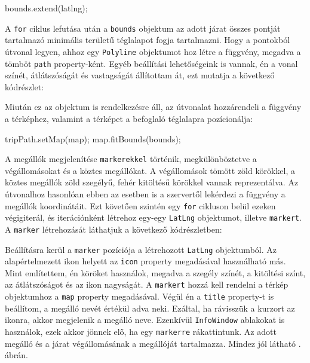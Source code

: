 \begin{cpp}
bounds.extend(latlng);
\end{cpp}

A \texttt{for} ciklus lefutása után a \texttt{bounds} objektum az adott járat összes pontját tartalmazó minimális területű téglalapot fogja tartalmazni.
Hogy a pontokból útvonal legyen, ahhoz egy \texttt{Polyline} objektumot hoz létre a függvény, megadva a tömböt \texttt{path} property-ként. Egyéb beállítási lehetőségeink is vannak, én a vonal színét, átlátszóságát és vastagságát állítottam át, ezt mutatja a következő kódrészlet:


Miután ez az objektum is rendelkezésre áll, az útvonalat hozzárendeli a függvény a térképhez, valamint a térképet a befoglaló téglalapra pozícionálja:

\begin{cpp}
tripPath.setMap(map);
map.fitBounds(bounds);
\end{cpp}

A megállók megjelenítése \texttt{markerekkel} történik, megkülönböztetve a végállomásokat és a köztes megállókat. A végállomások tömött zöld körökkel, a köztes megállók zöld szegélyű, fehér kitöltésű körökkel vannak reprezentálva. Az útvonalhoz hasonlóan ebben az esetben is a szervertől lekérdezi a függvény a megállók koordinátáit. Ezt követően szintén egy \texttt{for} cikluson belül ezeken végigiterál, és iterációnként létrehoz egy-egy \texttt{LatLng} objektumot, illetve \texttt{markert}. A \texttt{marker} létrehozását láthatjuk a következő kódrészletben:


Beállításra kerül a \texttt{marker} pozíciója a létrehozott \texttt{LatLng} objektumból. Az alapértelmezett ikon helyett az \texttt{icon} property megadásával használható más. Mint említettem, én köröket használok, megadva a szegély színét, a kitöltési színt, az átlátszóságot és az ikon nagyságát. A \texttt{markert} hozzá kell rendelni a térkép objektumhoz a \texttt{map} property megadásával. Végül én a \texttt{title} property-t is beállítom, a megálló nevét értékül adva neki. Ezáltal, ha rávisszük a kurzort az ikonra, akkor megjelenik a megálló neve. Ezenkívül \texttt{InfoWindow} ablakokat is használok, ezek akkor jönnek elő, ha egy \texttt{markerre} rákattintunk. Az adott megálló és a járat végállomásának a megállóját tartalmazza. Mindez jól látható . ábrán.

